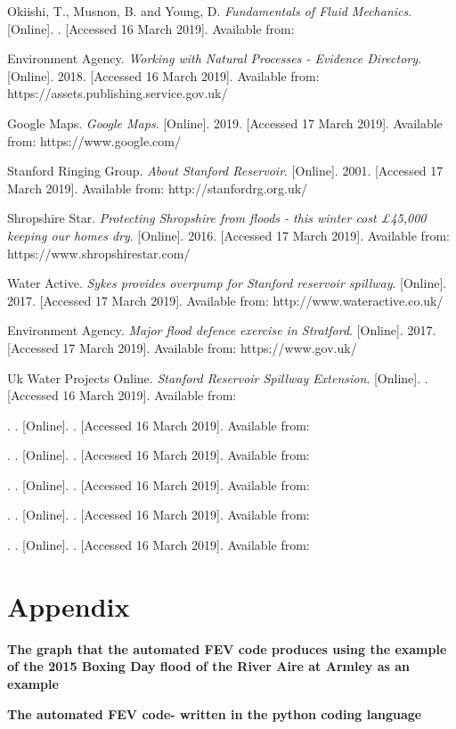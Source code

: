 \documentclass[11pt,a4paper]{article}
\begin{document}
\begin{thebibliography}{}
Okiishi, T., Musnon, B. and Young, D. \textit{Fundamentals of Fluid Mechanics}. [Online]. . [Accessed 16 March 2019]. Available from: 

Environment Agency. \textit{Working with Natural Processes - Evidence Directory}. [Online]. 2018. [Accessed 16 March 2019]. Available from: https://assets.publishing.service.gov.uk/

Google Maps. \textit{Google Maps}. [Online]. 2019. [Accessed 17 March 2019]. Available from: https://www.google.com/

Stanford Ringing Group. \textit{About Stanford Reservoir}. [Online]. 2001. [Accessed 17 March 2019]. Available from: http://stanfordrg.org.uk/

Shropshire Star. \textit{Protecting Shropshire from floods - this winter cost £45,000 keeping our homes dry}. [Online]. 2016. [Accessed 17 March 2019]. Available from: https://www.shropshirestar.com/

Water Active. \textit{Sykes provides overpump for Stanford reservoir spillway}. [Online]. 2017. [Accessed 17 March 2019]. Available from: http://www.wateractive.co.uk/

Environment Agency. \textit{Major flood defence exercise in Stratford}. [Online]. 2017. [Accessed 17 March 2019]. Available from: https://www.gov.uk/

Uk Water Projects Online. \textit{Stanford Reservoir Spillway Extension}. [Online]. . [Accessed 16 March 2019]. Available from:

\bibitem{}
. \textit{}. [Online]. . [Accessed 16 March 2019]. Available from:

\bibitem{}
. \textit{}. [Online]. . [Accessed 16 March 2019]. Available from:

\bibitem{}
. \textit{}. [Online]. . [Accessed 16 March 2019]. Available from:

\bibitem{}
. \textit{}. [Online]. . [Accessed 16 March 2019]. Available from:

\bibitem{}
. \textit{}. [Online]. . [Accessed 16 March 2019]. Available from:
\end{thebibliography}


\newpage
\appendix
\section{Appendix}
{\bf The graph that the automated FEV code produces using the example of the 2015 Boxing Day flood of the River Aire at Armley as an example}\\
\begin{figure}[H]
\begin{center}
\end{center}
\end{figure}
{\bf The automated FEV code- written in the python coding language}\\
\begin{spacing}{1}\footnotesize{}
\end{spacing}
\end{document}
